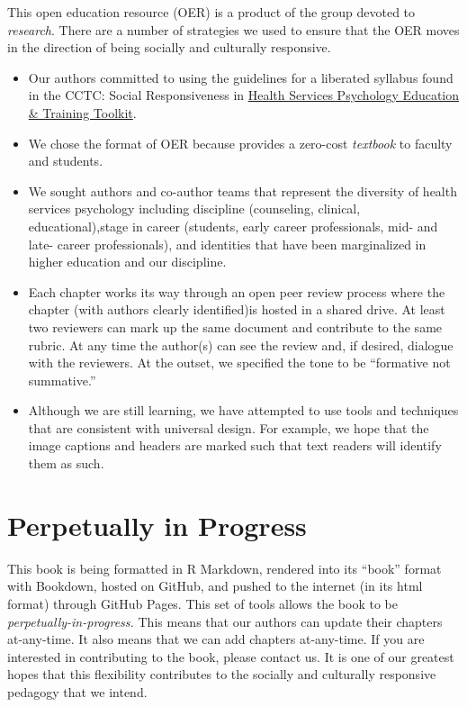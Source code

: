\documentclass[
  11pt,
]{book}
\providecommand{\tightlist}{%
  \setlength{\itemsep}{0pt}\setlength{\parskip}{0pt}}
\begin{document}
This open education resource (OER) is a product of the group devoted to \emph{research}. There are a number of strategies we used to ensure that the OER moves in the direction of being socially and culturally responsive.

\begin{itemize}
\tightlist
\item
  Our authors committed to using the guidelines for a liberated syllabus found in the CCTC: Social Responsiveness in \href{https://pr4tb8rrj317wdwt3xlafg2p-wpengine.netdna-ssl.com/wp-content/uploads/2021/05/CCTC_Socially-Responsive-HSP-Ed-Training_v7.pdf}{Health Services Psychology Education \& Training Toolkit}.
\item
  We chose the format of OER because provides a zero-cost \emph{textbook} to faculty and students.
\item
  We sought authors and co-author teams that represent the diversity of health services psychology including discipline (counseling, clinical, educational),stage in career (students, early career professionals, mid- and late- career professionals), and identities that have been marginalized in higher education and our discipline.
\item
  Each chapter works its way through an open peer review process where the chapter (with authors clearly identified)is hosted in a shared drive. At least two reviewers can mark up the same document and contribute to the same rubric. At any time the author(s) can see the review and, if desired, dialogue with the reviewers. At the outset, we specified the tone to be ``formative not summative.''
\item
  Although we are still learning, we have attempted to use tools and techniques that are consistent with universal design. For example, we hope that the image captions and headers are marked such that text readers will identify them as such.
\end{itemize}

\hypertarget{perpetually-in-progress}{%
\section*{Perpetually in Progress}\label{perpetually-in-progress}}

This book is being formatted in R Markdown, rendered into its ``book'' format with Bookdown, hosted on GitHub, and pushed to the internet (in its html format) through GitHub Pages. This set of tools allows the book to be \emph{perpetually-in-progress.} This means that our authors can update their chapters at-any-time. It also means that we can add chapters at-any-time. If you are interested in contributing to the book, please contact us. It is one of our greatest hopes that this flexibility contributes to the socially and culturally responsive pedagogy that we intend.
\end{document}
